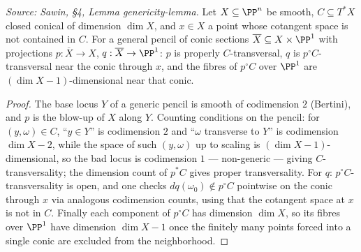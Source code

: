 \begin{lemma}
  \label{lem:sawin_genericity}
  \textit{Source: Sawin, §4, Lemma genericity-lemma.}
  Let $X\subseteq\PP^n$ be smooth, $C\subseteq T^*X$ closed conical of dimension
  $\dim X$, and $x\in X$ a point whose cotangent space is not contained in $C$.
  For a general pencil of conic sections $\overline X\subseteq X\times\PP^1$ with
  projections $p:\overline X\to X$, $q:\overline X\to\PP^1$: $p$ is properly
  $C$-transversal, $q$ is $p^\circ C$-transversal near the conic through $x$, and
  the fibres of $p^\circ C$ over $\PP^1$ are $(\dim X-1)$-dimensional near that
  conic.
\end{lemma}
\begin{proof}
  The base locus $Y$ of a generic pencil is smooth of codimension $2$ (Bertini),
  and $p$ is the blow-up of $X$ along $Y$.  Counting conditions on the pencil:
  for $(y,\omega)\in C$, ``$y\in Y$'' is codimension $2$ and ``$\omega$ transverse
  to $Y$'' is codimension $\dim X-2$, while the space of such $(y,\omega)$ up to
  scaling is $(\dim X-1)$-dimensional, so the bad locus is codimension $1$ ---
  non-generic --- giving $C$-transversality; the dimension count of $p^*C$ gives
  proper transversality.  For $q$: $p^\circ C$-transversality is open, and one
  checks $dq(\omega_0)\notin p^\circ C$ pointwise on the conic through $x$ via
  analogous codimension counts, using that the cotangent space at $x$ is not in
  $C$.  Finally each component of $p^\circ C$ has dimension $\dim X$, so its
  fibres over $\PP^1$ have dimension $\dim X-1$ once the finitely many points
  forced into a single conic are excluded from the neighborhood.
\end{proof}

